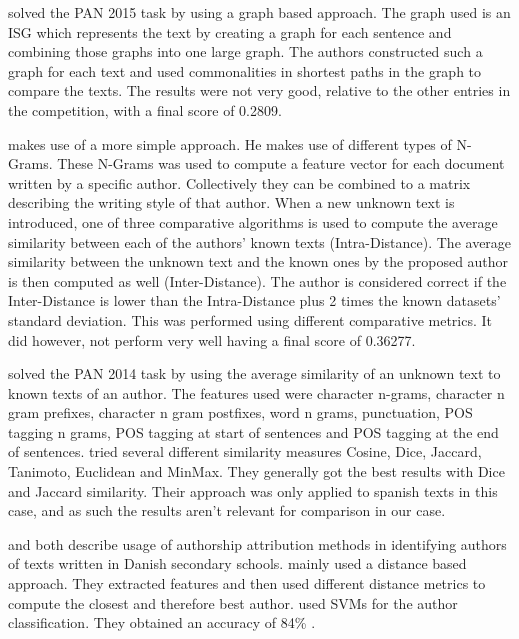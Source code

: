 \cite{gomezadorno2015} solved the PAN 2015 task by using a graph based approach.
The graph used is an \gls{ISG} which represents the text by creating a graph
for each sentence and combining those graphs into one large graph. The authors
constructed such a graph for each text and used commonalities in shortest paths
in the graph to compare the texts. The results were not very good, relative to
the other entries in the competition, with a final score of 0.2809.


\cite{layton:2014} makes use of a more simple approach. He makes use of
different types of N-Grams. These N-Grams was used to compute a feature
vector for each document written by a specific author. Collectively they can
be combined to a matrix describing the writing style of that author. When a
new unknown text is introduced, one of three comparative algorithms is used
to compute the average similarity between each of the authors' known texts
(Intra-Distance). The average similarity between the unknown text and the
known ones by the proposed author is then computed as well (Inter-Distance).
The author is considered correct if the Inter-Distance is lower than the
Intra-Distance plus 2 times the known datasets' standard deviation. This was
performed using different comparative metrics. It did however, not perform very
well having a final score of 0.36277.

\cite{castro2015} solved the PAN 2014 task by using the average similarity of
an unknown text to known texts of an author. The features used were character
n-grams, character n gram prefixes, character n gram postfixes, word n grams,
punctuation, \gls{POS} tagging n grams, \gls{POS} tagging at start of sentences
and \gls{POS} tagging at the end of sentences. \cite{castro2015} tried several
different similarity measures Cosine, Dice, Jaccard, Tanimoto, Euclidean and
MinMax. They generally got the best results with Dice and Jaccard similarity.
Their approach was only applied to spanish texts in this case, and as such
the results aren't relevant for comparison in our case.

\cite{hansen2014} and \cite{aalykke2016} both describe usage of authorship
attribution methods in identifying authors of texts written in Danish secondary
schools. \cite{aalykke2016} mainly used a distance based approach. They
extracted features and then used different distance metrics to compute the
closest and therefore best author. \cite{hansen2014} used \gls{SVM}s for the
author classification. They obtained an accuracy of 84\% .
